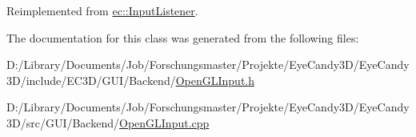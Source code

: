 Reimplemented from \mbox{\hyperlink{classec_1_1_input_listener_a25ef07efb72ac5c880cbca876ddfe66a}{ec\+::\+Input\+Listener}}.



The documentation for this class was generated from the following files\+:\begin{DoxyCompactItemize}
\item 
D\+:/\+Library/\+Documents/\+Job/\+Forschungsmaster/\+Projekte/\+Eye\+Candy3\+D/\+Eye\+Candy3\+D/include/\+E\+C3\+D/\+G\+U\+I/\+Backend/\mbox{\hyperlink{_open_g_l_input_8h}{Open\+G\+L\+Input.\+h}}\item 
D\+:/\+Library/\+Documents/\+Job/\+Forschungsmaster/\+Projekte/\+Eye\+Candy3\+D/\+Eye\+Candy3\+D/src/\+G\+U\+I/\+Backend/\mbox{\hyperlink{_open_g_l_input_8cpp}{Open\+G\+L\+Input.\+cpp}}\end{DoxyCompactItemize}
